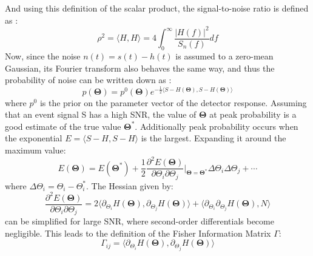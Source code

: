    And using this definition of the scalar product, the signal-to-noise ratio is
    defined as :
    \begin{equation}
        \rho^2 =
            \langle H, H \rangle =
                4 \int_0^\infty \dfrac{|H(f)|^2}{S_n(f)} df
    \end{equation}
    Now, since the noise $n(t) = s(t) - h(t)$ is assumed to a zero-mean Gaussian, its
    Fourier transform also behaves the same way, and thus the probability of noise can
    be written down as :
    \begin{equation}
        \label{eq:probability}
        p(\mathbf{\Theta}) =
            p^0(\mathbf{\Theta})
            e^{
                -\frac{1}{2}
                \langle S - H(\mathbf{\Theta}), S - H(\mathbf{\Theta}) \rangle
            }
    \end{equation}
    where $p^0$ is the prior on the parameter vector of the detector response. Assuming
    that an event signal S has a high SNR, the value of $\mathbf{\Theta}$ at peak
    probability is a good estimate of the true value $\mathbf{\Theta}^{\ast}$.
    Additionally peak probability occurs when the exponential $E = \langle S - H, S - H
    \rangle$ is the largest. Expanding it around the maximum value:
    \begin{equation}
        E(\mathbf{\Theta}) =
            E(\mathbf{\Theta}^{\ast}) +
            \dfrac{1}{2}
            \dfrac{\partial^2 E(\mathbf{\Theta})}{\partial \Theta_i \partial \Theta_j}
            \bigg\rvert_{\mathbf{\Theta} =
                \mathbf{\Theta}^{\ast}}
                \Delta\Theta_i \Delta\Theta_j +
                \cdots
    \end{equation}
    where $\Delta \Theta_i = \Theta_i - \Theta_i^\ast$. The Hessian given by:
    \begin{equation}
        \dfrac{\partial^2 E(\mathbf{\Theta})}{\partial \Theta_i \partial \Theta_j} =
            2 \langle
                  \partial_{\Theta_i} H(\mathbf{\Theta}),
                  \partial_{\Theta_j} H(\mathbf{\Theta})
              \rangle +
              \langle
                  \partial_{\Theta_i} \partial_{\Theta_j} H(\mathbf{\Theta}),
                  N
              \rangle
    \end{equation}
    can be simplified for large SNR, where second-order differentials become negligible.
    This leads to the definition of the Fisher Information Matrix $\Gamma$:
    \begin{equation}
        \Gamma_{ij} =
            \langle
                \partial_{\Theta_i} H(\mathbf{\Theta}),
                \partial_{\Theta_j} H(\mathbf{\Theta})
            \rangle
    \end{equation}
